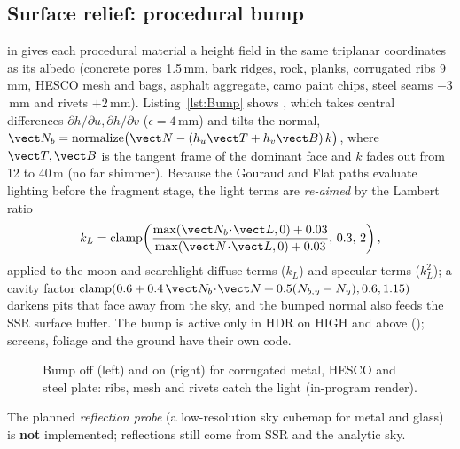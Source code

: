 \subsection{Surface relief: procedural bump}
 in  gives each procedural material a height field in the same triplanar coordinates as its albedo (concrete pores 1.5\,mm, bark ridges, rock, planks, corrugated ribs 9\,mm, HESCO mesh and bags, asphalt
aggregate, camo paint chips, steel seams $-3$\,mm and rivets $+2$\,mm). Listing~\ref{lst:Bump} shows , which takes central differences $\partial h/\partial u,\partial h/\partial v$ ($\epsilon=4$\,mm) and tilts the normal,
$\vect N_b=\mathrm{normalize}\bigl(\vect N-(h_u\vect T+h_v\vect B)\,k\bigr)$, where $\vect T,\vect B$ is the tangent frame of the dominant face and $k$ fades out from 12 to 40\,m (no far shimmer). Because the Gouraud and Flat paths evaluate lighting before the fragment
stage, the light terms are \emph{re-aimed} by the Lambert ratio
\begin{equation}
k_L=\mathrm{clamp}\!\left(\frac{\max(\vect N_b\!\cdot\!\vect L,0)+0.03}{\max(\vect N\!\cdot\!\vect L,0)+0.03},\,0.3,\,2\right),
\end{equation}
applied to the moon and searchlight diffuse terms ($k_L$) and specular terms ($k_L^2$); a cavity factor $\mathrm{clamp}(0.6+0.4\,\vect N_b\!\cdot\!\vect N+0.5(N_{b,y}-N_y),0.6,1.15)$ darkens pits that face away from the sky, and the bumped normal also feeds the SSR surface buffer. The bump is active
only in HDR on HIGH and above (); screens, foliage and the ground have their own code. \lstBump
\begin{figure}[h]
\centering
{}
\caption{Bump off (left) and on (right) for corrugated metal, HESCO and steel plate: ribs, mesh and rivets catch the light (in-program render).}
\end{figure}
The planned \emph{reflection probe} (a low-resolution sky cubemap for metal and glass) is \textbf{not} implemented; reflections still come from SSR and the analytic sky.
